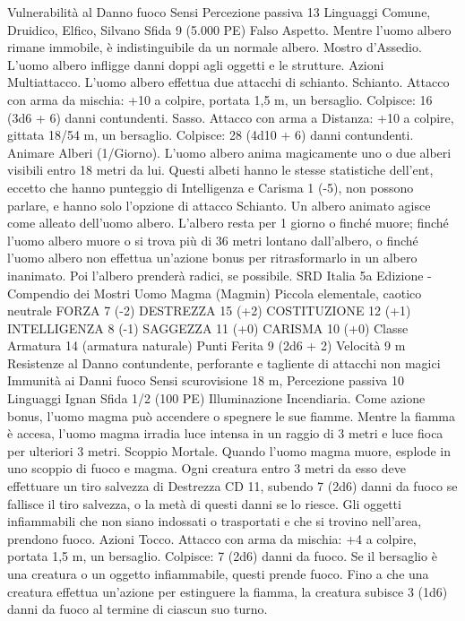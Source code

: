 \begin{multicols}{2}
Vulnerabilità al Danno fuoco
Sensi Percezione passiva 13
Linguaggi Comune, Druidico, Elfico, Silvano
Sfida 9 (5.000 PE)
Falso Aspetto. Mentre l’uomo albero rimane immobile, è
indistinguibile da un normale albero.
Mostro d’Assedio. L’uomo albero infligge danni doppi agli
oggetti e le strutture.
Azioni
Multiattacco. L’uomo albero effettua due attacchi di schianto.
Schianto. Attacco con arma da mischia: +10 a colpire, portata
1,5 m, un bersaglio.
Colpisce: 16 (3d6 + 6) danni contundenti.
Sasso. Attacco con arma a Distanza: +10 a colpire, gittata 18/54
m, un bersaglio.
Colpisce: 28 (4d10 + 6) danni contundenti.
Animare Alberi (1/Giorno). L’uomo albero anima magicamente
uno o due alberi visibili entro 18 metri da lui. Questi albeti hanno
le stesse statistiche dell’ent, eccetto che hanno punteggio di
Intelligenza e Carisma 1 (-5), non possono parlare, e hanno solo
l’opzione di attacco Schianto. Un albero animato agisce come
alleato dell’uomo albero. L’albero resta per 1 giorno o finché
muore; finché l’uomo albero muore o si trova più di 36 metri
lontano dall’albero, o finché l’uomo albero non effettua
un’azione bonus per ritrasformarlo in un albero inanimato. Poi
l’albero prenderà radici, se possibile.
SRD Italia 5a Edizione - Compendio dei Mostri
Uomo Magma
(Magmin)
Piccola elementale, caotico neutrale
FORZA 7 (-2)
DESTREZZA 15 (+2)
COSTITUZIONE 12 (+1)
INTELLIGENZA 8 (-1)
SAGGEZZA 11 (+0)
CARISMA 10 (+0)
Classe Armatura 14 (armatura naturale)
Punti Ferita 9 (2d6 + 2)
Velocità 9 m
Resistenze al Danno contundente, perforante e tagliente di
attacchi non magici
Immunità ai Danni fuoco
Sensi scurovisione 18 m, Percezione passiva 10
Linguaggi Ignan
Sfida 1/2 (100 PE)
Illuminazione Incendiaria. Come azione bonus, l’uomo magma
può accendere o spegnere le sue fiamme. Mentre la fiamma è
accesa, l’uomo magma irradia luce intensa in un raggio di 3
metri e luce fioca per ulteriori 3 metri.
Scoppio Mortale. Quando l’uomo magma muore, esplode in uno
scoppio di fuoco e magma. Ogni creatura entro 3 metri da esso
deve effettuare un tiro salvezza di Destrezza CD 11, subendo 7
(2d6) danni da fuoco se fallisce il tiro salvezza, o la metà di
questi danni se lo riesce. Gli oggetti infiammabili che non siano
indossati o trasportati e che si trovino nell’area, prendono fuoco.
Azioni
Tocco. Attacco con arma da mischia: +4 a colpire, portata 1,5 m,
un bersaglio.
Colpisce: 7 (2d6) danni da fuoco. Se il bersaglio è una creatura o
un oggetto infiammabile, questi prende fuoco. Fino a che una
creatura effettua un’azione per estinguere la fiamma, la creatura
subisce 3 (1d6) danni da fuoco al termine di ciascun suo turno.

\end{multicols}
